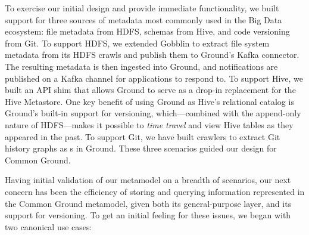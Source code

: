 \documentclass{sig-alternate}
\begin{document}





To exercise our initial design and provide immediate functionality,
we built
support for three sources of metadata most commonly used in the Big Data ecosystem: file metadata from HDFS, schemas from Hive, and code versioning from Git.
To support HDFS, we extended Gobblin to extract file system metadata from its HDFS crawls and publish them to Ground's Kafka connector. The resulting metadata is then ingested into Ground, and notifications are published on a Kafka channel for applications to respond to. To support Hive, we built an API shim that allows Ground to serve as a drop-in replacement for the Hive Metastore.
One key benefit of using Ground as Hive's relational catalog is Ground's built-in support for versioning, which---combined with the append-only nature of HDFS---makes it possible to \emph{time travel} and view Hive tables as they appeared in the past.  To support Git, we have built crawlers to extract Git history graphs as s in Ground. These three scenarios guided our design for Common Ground.

Having initial validation of our metamodel on a breadth of scenarios, our next concern has been the efficiency of storing and querying information represented in the Common Ground metamodel, given both its general-purpose \mantle layer, and its support for versioning. To get an initial feeling for these issues, we began with two canonical use cases:
\end{document}
